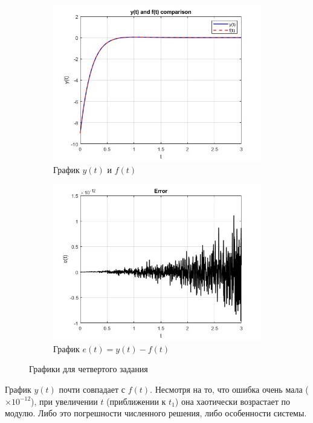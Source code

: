 \documentclass[a4paper, 12pt]{article}
\begin{document}
    \begin{figure}[H]
        \centering
        \begin{subfigure}{0.45\textwidth}
            \centering
            \includegraphics[width=\linewidth]{task_4_y_t_f_t.jpg}
            \caption{График $y(t)$ и $f(t)$}
            \label{fig:task_4_y_t_f_t}
        \end{subfigure}
        \hfill
        \begin{subfigure}{0.45\textwidth}
            \centering
            \includegraphics[width=\linewidth]{task_4_err.jpg}
            \caption{График $e(t)=y(t)-f(t)$}
            \label{fig:task_4_err}
        \end{subfigure}
        \caption{Графики для четвертого задания}
        \label{fig:task_4_modeling}
    \end{figure}
    \noindent График $y(t)$ почти совпадает с $f(t)$. Несмотря на то, что ошибка очень мала ($\times10^{-12}$),
    при увеличении $t$ (приближении к $t_1$) она хаотически возрастает по модулю. Либо это погрешности численного решения,
    либо особенности системы.
\end{document}
